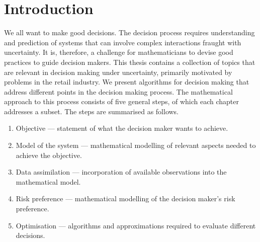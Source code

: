 \documentclass[main.tex]{subfiles}
\begin{document}
\chapter{Introduction}
We all want to make good decisions. The decision
process requires understanding and prediction of systems that can
involve complex interactions fraught with uncertainty. It is, therefore,
a challenge for mathematicians to devise good practices
to guide decision makers.
This thesis contains a collection of topics that are relevant
in decision making under uncertainty, primarily motivated by
problems in the retail industry.
We present algorithms for decision making that address different
points in the decision making process.
The mathematical approach to this process consists of
five general steps, of which each chapter addresses a subset.
The steps are summarised as follows.
\begin{enumerate}\label{enum:making_decisions}
\item Objective --- statement of what the decision maker wants to achieve.
\item Model of the system --- mathematical modelling of relevant aspects
  needed to achieve the objective.
\item Data assimilation --- incorporation of available observations into
  the mathematical model.
\item Risk preference --- mathematical modelling of the decision maker's risk
  preference.
\item Optimisation --- algorithms and approximations required to
  evaluate different decisions.
\end{enumerate}
\end{document}
